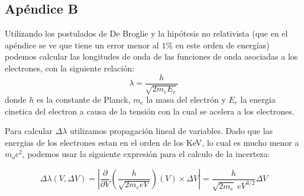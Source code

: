 \documentclass[]{article}
\begin{document}
\newpage

\hypertarget{apuxe9ndice-b}{%
\subsection{Apéndice B}\label{apuxe9ndice-b}}

Utilizando los postulados de De Broglie y la hipótesis no relativista
(que en el apéndice se ve que tiene un error menor al \(1\%\) en este
orden de energías) podemos calcular las longitudes de onda de las
funciones de onda asociadas a los electrones, con la siguiente relación:
\[\lambda = \frac{h}{\sqrt{2m_e E_c}}\] donde \(h\) es la constante de
Planck, \(m_e\) la masa del electrón y \(E_c\) la energia cinetica del
electron a causa de la tensión con la cual se acelera a los electrones.

Para calcular \(\Delta \lambda\) utilizamos propagación lineal de
variables. Dado que las energias de los electrones estan en el orden de
los KeV, lo cual es mucho menor a \(m_o c^2\), podemos usar la siguiente
expresión para el calculo de la incerteza:

\[\Delta \lambda(V, \Delta V) =
\left |
    \frac{\partial}{\partial V} \left (
        \frac{h}{\sqrt{2m_e eV}}
    \right )(V) \times \Delta V
\right | = \frac{h}{\sqrt{2m_e}\ eV^{3/2}} \Delta V\]
\end{document}
